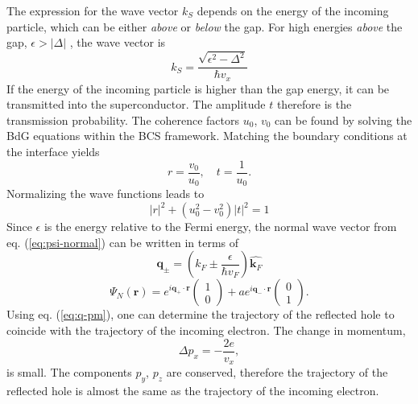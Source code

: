 The expression for the wave vector $k_S$ depends on the energy of the incoming particle, which can be either \emph{above} or \emph{below} the gap.\newline \newline
For high energies \emph{above} the gap,  $\epsilon > |\Delta|$ , the wave vector is
\begin{equation}
k_S = \frac{\sqrt{\epsilon^2 - \Delta^2}}{\hbar v_x}
\end{equation}
If the energy of the incoming particle is higher than the gap energy, it can be transmitted into the superconductor. The amplitude $t$ therefore is the transmission probability. The coherence factors $u_0$, $v_0$ can be found by solving the BdG equations within the BCS framework. Matching the boundary conditions at the interface yields
\begin{equation}
r = \frac{v_0}{u_0}, \quad t = \frac{1}{u_0}.
\end{equation}
Normalizing the wave functions leads to 
\begin{equation}
|r|^2 + (u_0^2 - v_0^2)|t|^2 = 1
\end{equation}
Since $\epsilon$ is the energy relative to the Fermi energy, the normal wave vector from eq. (\ref{eq:psi-normal}) can be written in terms of
\begin{equation}
\mathbf{q}_\pm =  \left( k_F \pm \frac{\epsilon}{\hbar v_F} \right) \hat{\mathbf{k}_F} \label{eq:q-pm}
\end{equation}
\begin{equation}
\Psi_N \left( \mathbf{r} \right) = e^{i\mathbf{q}_+ \cdot \mathbf{r}} \begin{pmatrix} 1 \\ 0\end{pmatrix} + a e^{i\mathbf{q}_- \cdot \mathbf{r}} \begin{pmatrix} 0 \\ 1\end{pmatrix}.
\end{equation}
Using eq. (\ref{eq:q-pm}), one can determine the trajectory of the reflected hole to coincide with the trajectory of the incoming electron. The change in momentum,
\begin{equation}
\Delta p_x = - \frac{2 e }{v_x},
\end{equation}
is small. The components $p_y$, $p_z$ are conserved, therefore the trajectory of the reflected hole is almost the same as the trajectory of the incoming electron. %


